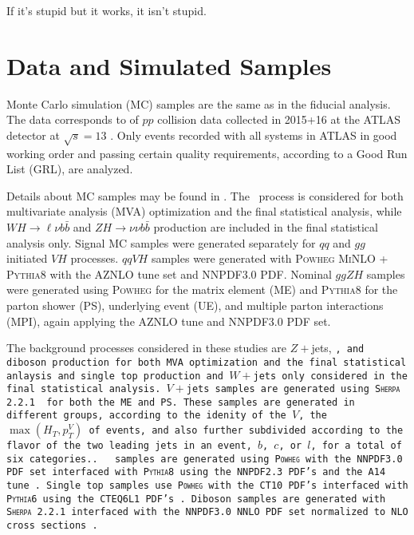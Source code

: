 \begin{savequote}[75mm]
If it's stupid but it works, it isn't stupid.
\end{savequote}

\chapter{Data and Simulated Samples}
\label{ch:samples}
 Monte Carlo simulation (MC) samples are the same as in the fiducial analysis.  The data corresponds to \LUMI of $pp$ collision data collected in 2015+16 at the ATLAS detector at $\sqrt{s}=13$ \TeV.  Only events recorded with all systems in ATLAS in good working order and passing certain quality requirements, according to a Good Run List (GRL), are analyzed.

Details about MC samples may be found in \cite{modelingnote}.  The \ZH\, process is considered for both multivariate analysis (MVA) optimization and the final statistical analysis, while $WH\to\ell\nu b\bar{b}$ and $ZH\to\nu\nu b\bar{b}$ production are included in the final statistical analysis only.  Signal MC samples were generated separately for $qq$ and $gg$ initiated $VH$ processes.  $qqVH$ samples were generated with \textsc{Powheg MiNLO + Pythia8} with the AZNLO tune set and NNPDF3.0 PDF.  %
  Nominal $ggZH$ samples were generated using \textsc{Powheg} for the matrix element (ME) and \textsc{Pythia8} for the parton shower (PS), underlying event (UE), and multiple parton interactions (MPI), again applying the AZNLO tune and NNPDF3.0 PDF set. \cite{support17}

The background processes considered in these studies are $Z+$jets, \tt, and diboson production for both MVA optimization and the final statistical anlaysis and single top production and $W+$jets only considered in the final statistical analysis.  $V+$jets samples are generated using \textsc{Sherpa 2.2.1} \cite{support18} for both the ME and PS.  These samples are generated in different groups, according to the idenity of the $V$, the $\max\left(H_T,p_T^V\right)$ of events, and also further subdivided according to the flavor of the two leading jets in an event, $b$, $c$, or $l$, for a total of six categories..  \tt\, samples are generated using \textsc{Powheg} with the NNPDF3.0 PDF set interfaced with \textsc{Pythia8} using the NNPDF2.3 PDF's and the A14 tune \cite{support19}.  Single top samples use \textsc{Powheg} with the CT10 PDF's interfaced with \textsc{Pythia6} using the CTEQ6L1 PDF's \cite{support20,support21}.  Diboson samples are generated with \textsc{Sherpa 2.2.1} interfaced with the NNPDF3.0 NNLO PDF set normalized to NLO cross sections \cite{support22}.


